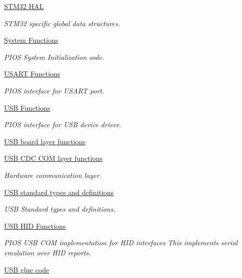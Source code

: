 \begin{DoxyCompactItemize}
\hyperlink{group___p_i_o_s___s_t_m32}{\-S\-T\-M32 H\-A\-L}
\begin{DoxyCompactList}\small\item\em \-S\-T\-M32 specific global data structures. \end{DoxyCompactList}\item 
\hyperlink{group___p_i_o_s___s_y_s}{\-System Functions}
\begin{DoxyCompactList}\small\item\em \-P\-I\-O\-S \-System \-Initialization code. \end{DoxyCompactList}\item 
\hyperlink{group___p_i_o_s___u_s_a_r_t}{\-U\-S\-A\-R\-T Functions}
\begin{DoxyCompactList}\small\item\em \-P\-I\-O\-S interface for \-U\-S\-A\-R\-T port. \end{DoxyCompactList}\item 
\hyperlink{group___p_i_o_s___u_s_b}{\-U\-S\-B Functions}
\begin{DoxyCompactList}\small\item\em \-P\-I\-O\-S interface for \-U\-S\-B device driver. \end{DoxyCompactList}\item 
\hyperlink{group___p_i_o_s___u_s_b___b_o_a_r_d}{\-U\-S\-B board layer functions}
\item 
\hyperlink{group___p_i_o_s___u_s_b___c_o_m}{\-U\-S\-B C\-D\-C C\-O\-M layer functions}
\begin{DoxyCompactList}\small\item\em \-Hardware communication layer. \end{DoxyCompactList}\item 
\hyperlink{group___p_i_o_s___u_s_b___d_e_f_s}{\-U\-S\-B standard types and definitions}
\begin{DoxyCompactList}\small\item\em \-U\-S\-B \-Standard types and definitions. \end{DoxyCompactList}\item 
\hyperlink{group___p_i_o_s___u_s_b___h_i_d}{\-U\-S\-B H\-I\-D Functions}
\begin{DoxyCompactList}\small\item\em \-P\-I\-O\-S \-U\-S\-B \-C\-O\-M implementation for \-H\-I\-D interfaces  \-This implements serial emulation over \-H\-I\-D reports. \end{DoxyCompactList}\item 
\hyperlink{group___p_i_o_s___u_s_b_h_o_o_k}{\-U\-S\-B glue code}

\end{DoxyCompactItemize}
